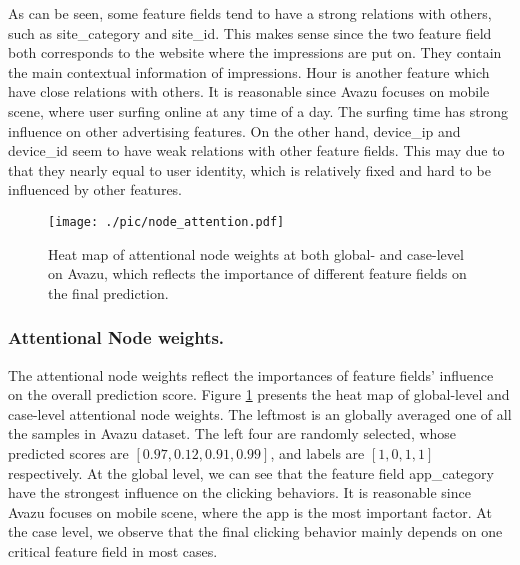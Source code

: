 \documentclass[sigconf]{acmart}
\begin{document}
As can be seen, some feature fields tend to have a strong relations with others, such as \textsf{site\_category} and \textsf{site\_id}.
This makes sense since the two feature field both corresponds to the website where the impressions are put on. They contain the main contextual information of impressions. 
\textsf{Hour} is another feature which have close relations with others. It is reasonable since Avazu focuses on mobile scene, where user surfing online at any time of a day.  
The surfing time has strong influence on other advertising features.  
On the other hand, \textsf{device\_ip} and \textsf{device\_id} seem to have weak relations with other feature fields.
This may due to that they nearly equal to user identity, which is relatively fixed and hard to be influenced by other features. 

\begin{figure}[t]
\centering
\texttt{[image: ./pic/node\_attention.pdf]}
\caption{Heat map of attentional node weights at both global- and case-level on Avazu, which reflects the importance of different feature fields on the final prediction.}
\label{fig:heatmap_node}
\vspace{-5mm}
\end{figure}

\subsubsection{\textbf{Attentional Node weights.}}
The attentional node weights reflect the importances of feature fields' influence on the overall prediction score.
Figure \ref{fig:heatmap_node} presents the heat map of global-level and case-level attentional node weights.
The leftmost is an globally averaged one of all the samples in Avazu dataset.
The left four are randomly selected, whose predicted scores are $[0.97, 0.12, 0.91, 0.99]$, and labels are $[1, 0, 1, 1]$ respectively. 
At the global level, we can see that the feature field \textsf{app\_category} have the strongest influence on the clicking behaviors. 
It is reasonable since Avazu focuses on mobile scene, where the app is the most important factor. 
At the case level, we observe that the final clicking behavior mainly depends on one critical feature field in most cases.
\end{document}
